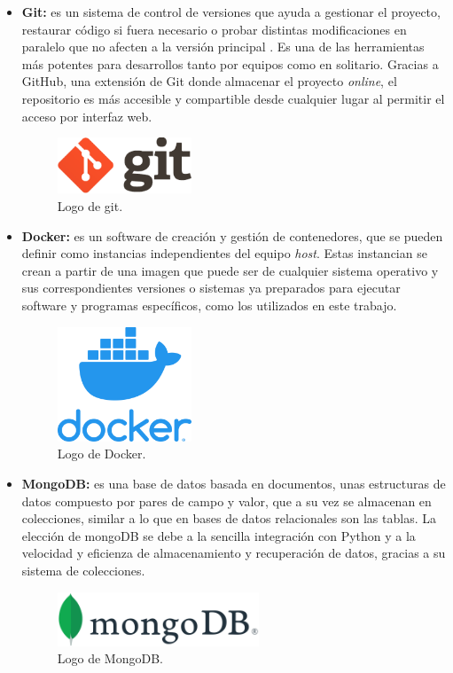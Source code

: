 \begin{itemize}
    \item \textbf{Git: }es un sistema de control de versiones que ayuda a gestionar el proyecto, restaurar código si fuera necesario o probar distintas modificaciones en paralelo que no afecten a la versión principal \cite{cap3_6}. Es una de las herramientas más potentes para desarrollos tanto por equipos como en solitario. Gracias a GitHub, una extensión de Git donde almacenar el proyecto \textit{online}, el repositorio es más accesible y compartible desde cualquier lugar al permitir el acceso por interfaz web.
    \begin{figure}[h]
        \centering
        \includegraphics[width=4cm]{imagenes/capitulo3/gitLogo.png}
        \caption{Logo de git.}
        \label{fig:git_logo}
    \end{figure}

    \item \textbf{Docker: }es un software de creación y gestión de contenedores, que se pueden definir como instancias independientes del equipo \textit{host}. Estas instancian se crean a partir de una imagen que puede ser de cualquier sistema operativo y sus correspondientes versiones o sistemas ya preparados para ejecutar software y programas específicos, como los utilizados en este trabajo.
    \begin{figure}[h]
        \centering
        \includegraphics[width=4cm]{imagenes/capitulo3/dockerLogo.png}
        \caption{Logo de Docker.}
        \label{fig:docker_logo}
    \end{figure}

    \item \textbf{MongoDB: }es una base de datos basada en documentos, unas estructuras de datos compuesto por pares de campo y valor, que a su vez se almacenan en colecciones, similar a lo que en bases de datos relacionales son las tablas. La elección de mongoDB se debe a la sencilla integración con Python y a la velocidad y eficienza de almacenamiento y recuperación de datos, gracias a su sistema de colecciones.
    \begin{figure}[h]
        \centering
        \includegraphics[width=6cm]{imagenes/capitulo3/mongoDBLogo.png}
        \caption{Logo de MongoDB.}
        \label{fig:mongodb_logo}
    \end{figure}


\end{itemize}

